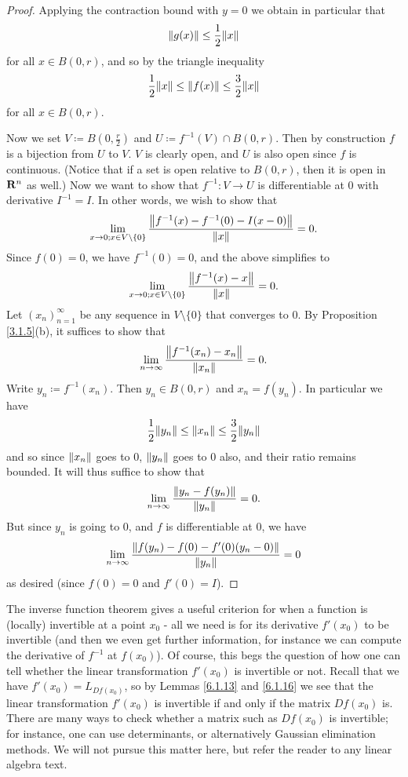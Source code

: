 \begin{proof}
    Applying the contraction bound with \(y = 0\) we obtain in particular that
    \[
        \norm*{g(x)} \leq \frac{1}{2} \norm*{x}
    \]
    for all \(x \in B(0, r)\), and so by the triangle inequality
    \[
        \frac{1}{2} \norm*{x} \leq \norm*{f(x)} \leq \frac{3}{2} \norm*{x}
    \]
    for all \(x \in B(0, r)\).

    Now we set \(V \coloneqq B(0, \frac{r}{2})\) and \(U \coloneqq f^{-1}(V) \cap B(0, r)\).
    Then by construction \(f\) is a bijection from \(U\) to \(V\).
    \(V\) is clearly open, and \(U\) is also open since \(f\) is continuous.
    (Notice that if a set is open relative to \(B(0, r)\), then it is open in \(\R^n\) as well.)
    Now we want to show that \(f^{-1} : V \to U\) is differentiable at \(0\) with derivative \(I^{-1} = I\).
    In other words, we wish to show that
    \[
        \lim_{x \to 0 ; x \in V \setminus \{0\}} \frac{\norm*{f^{-1}(x) - f^{-1}(0) - I(x - 0)}}{\norm*{x}} = 0.
    \]
    Since \(f(0) = 0\), we have \(f^{-1}(0) = 0\), and the above simplifies to
    \[
        \lim_{x \to 0 ; x \in V \setminus \{0\}} \frac{\norm*{f^{-1}(x) - x}}{\norm*{x}} = 0.
    \]
    Let \((x_n)_{n = 1}^\infty\) be any sequence in \(V \setminus \{0\}\) that converges to \(0\).
    By Proposition \ref{3.1.5}(b), it suffices to show that
    \[
        \lim_{n \to \infty} \frac{\norm*{f^{-1}(x_n) - x_n}}{\norm*{x_n}} = 0.
    \]
    Write \(y_n \coloneqq f^{-1}(x_n)\).
    Then \(y_n \in B(0, r)\) and \(x_n = f(y_n)\).
    In particular we have
    \[
        \frac{1}{2} \norm*{y_n} \leq \norm*{x_n} \leq \frac{3}{2} \norm*{y_n}
    \]
    and so since \(\norm*{x_n}\) goes to \(0\), \(\norm*{y_n}\) goes to \(0\) also, and their ratio remains bounded.
    It will thus suffice to show that
    \[
        \lim_{n \to \infty} \frac{\norm*{y_n - f(y_n)}}{\norm*{y_n}} = 0.
    \]
    But since \(y_n\) is going to \(0\), and \(f\) is differentiable at \(0\), we have
    \[
        \lim_{n \to \infty} \frac{\norm*{f(y_n) - f(0) - f'(0)(y_n - 0)}}{\norm*{y_n}} = 0
    \]
    as desired (since \(f(0) = 0\) and \(f'(0) = I\)).
\end{proof}

\begin{note}
    The inverse function theorem gives a useful criterion for when a function is (locally) invertible at a point \(x_0\)
    - all we need is for its derivative \(f'(x_0)\) to be invertible
    (and then we even get further information, for instance we can compute the derivative of \(f^{-1}\) at \(f(x_0)\)).
    Of course, this begs the question of how one can tell whether the linear transformation \(f'(x_0)\) is invertible or not.
    Recall that we have \(f'(x_0) = L_{D f(x_0)}\), so by Lemmas \ref{6.1.13} and \ref{6.1.16} we see that the linear transformation \(f'(x_0)\) is invertible if and only if the matrix \(D f(x_0)\) is.
    There are many ways to check whether a matrix such as \(D f(x_0)\) is invertible;
    for instance, one can use determinants, or alternatively Gaussian elimination methods.
    We will not pursue this matter here, but refer the reader to any linear algebra text.
\end{note}

